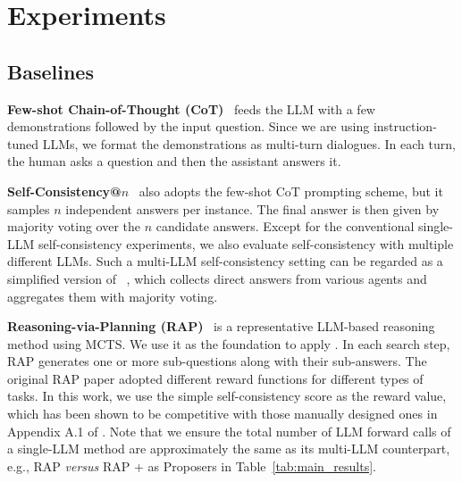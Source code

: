 




\section{Experiments}
\label{sec:exp}


\subsection{Baselines}
\label{sec:exp:baselines}

\textbf{Few-shot Chain-of-Thought (CoT)}~\cite{wei2023chainofthoughtpromptingelicitsreasoning} feeds the LLM with a few demonstrations followed by the input question.
Since we are using instruction-tuned LLMs, we format the demonstrations as multi-turn dialogues.
In each turn, the human asks a question and then the assistant answers it.

\textbf{Self-Consistency@$\mathbf{\textit{n}}$}~\cite{wang2023selfconsistency} also adopts the few-shot CoT prompting scheme, but it samples $n$ independent answers per instance.
The final answer is then given by majority voting over the $n$ candidate answers.
Except for the conventional single-LLM self-consistency experiments, we also evaluate self-consistency with multiple different LLMs.
Such a multi-LLM self-consistency setting can be regarded as a simplified version of ~\citet{moa}, which collects direct answers from various agents and aggregates them with majority voting.

\textbf{Reasoning-via-Planning (RAP)}~\cite{hao-etal-2023-reasoning} is a representative LLM-based reasoning method using MCTS.
We use it as the foundation to apply \mosa.
In each search step, RAP generates one or more sub-questions along with their sub-answers.
The original RAP paper adopted different reward functions for different types of tasks.
In this work, we use the simple self-consistency score as the reward value, which has been shown to be competitive with those manually designed ones in Appendix A.1 of \citet{qi2024mutual}.
Note that we ensure the total number of LLM forward calls of a single-LLM method are approximately the same as its multi-LLM counterpart, e.g., RAP \emph{versus} RAP + \mosa{} as Proposers in Table~\ref{tab:main_results}.

